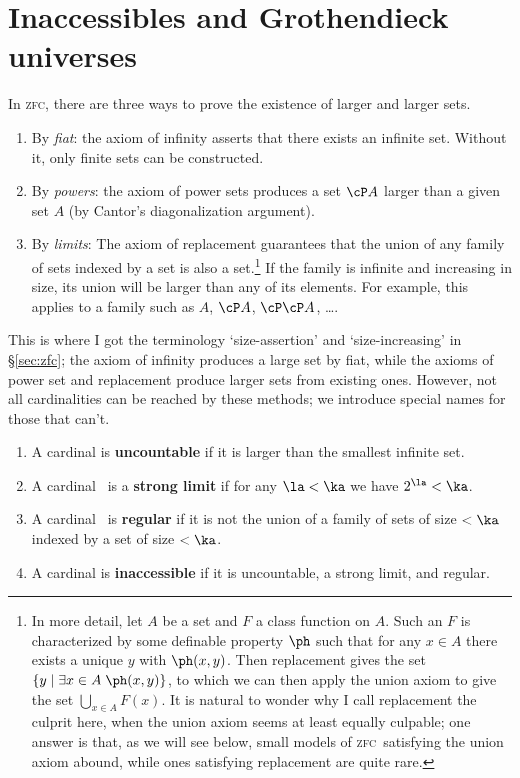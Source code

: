 \documentclass{amsart}
\def\zfc{\textsc{zfc}}
\begin{document}
\section{Inaccessibles and Grothendieck universes}
\label{sec:universes}

In \zfc, there are three ways to prove the existence of larger and
larger sets.
\begin{enumerate}[(1)]
\item By \emph{fiat}: the axiom of infinity asserts that there exists
  an infinite set.  Without it, only finite sets can be constructed.
\item By \emph{powers}: the axiom of power sets produces a set $\cP
  A$ larger than a given set $A$ (by Cantor's diagonalization
  argument).
\item By \emph{limits}: The axiom of replacement guarantees that the
  union of any family of sets indexed by a set is also a
  set.\footnote{In more detail, let $A$ be a set and $F$ a class
    function on $A$.  Such an $F$ is characterized by some definable
    property $\ph$ such that for any $x\in A$ there exists a unique
    $y$ with $\ph(x,y)$.  Then replacement gives the set $\{y \mid
    \exists x\in A\; \ph(x,y)\}$, to which we can then apply the union
    axiom to give the set $\bigcup_{x\in A} F(x)$.  It is natural to
    wonder why I call replacement the culprit here, when the union
    axiom seems at least equally culpable; one answer is that, as we
    will see below, small models of \zfc\ satisfying the union axiom
    abound, while ones satisfying replacement are quite rare.}  If the
  family is infinite and increasing in size, its union will be larger
  than any of its elements.  For example, this applies to a family
  such as $A$, $\cP A$, $\cP\cP A$, \dots.
\end{enumerate}
This is where I got the terminology `size-assertion' and
`size-increasing' in \S\ref{sec:zfc}; the axiom of infinity produces a
large set by fiat, while the axioms of power set and replacement
produce larger sets from existing ones.  However, not all
cardinalities can be reached by these methods; we introduce special
names for those that can't.
\begin{enumerate}
\item A cardinal is \textbf{uncountable} if it is larger than the
  smallest infinite set.
\item A cardinal \ka\ is a \textbf{strong limit} if for any $\la<\ka$ we
  have $2^\la < \ka$.
\item A cardinal \ka\ is \textbf{regular} if it is not the union of a
  family of sets of size $<\ka$ indexed by a set of size $<\ka$.
\item A cardinal is \textbf{inaccessible} if it is uncountable, a
  strong limit, and regular.
\end{enumerate}
\end{document}
